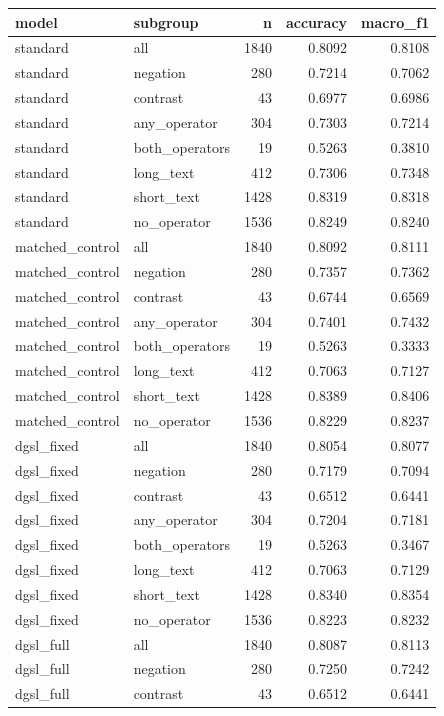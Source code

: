 \begin{tabular}{llrrr}
\toprule
model & subgroup & n & accuracy & macro\_f1 \\
\midrule
standard & all & 1840 & 0.8092 & 0.8108 \\
standard & negation & 280 & 0.7214 & 0.7062 \\
standard & contrast & 43 & 0.6977 & 0.6986 \\
standard & any\_operator & 304 & 0.7303 & 0.7214 \\
standard & both\_operators & 19 & 0.5263 & 0.3810 \\
standard & long\_text & 412 & 0.7306 & 0.7348 \\
standard & short\_text & 1428 & 0.8319 & 0.8318 \\
standard & no\_operator & 1536 & 0.8249 & 0.8240 \\
matched\_control & all & 1840 & 0.8092 & 0.8111 \\
matched\_control & negation & 280 & 0.7357 & 0.7362 \\
matched\_control & contrast & 43 & 0.6744 & 0.6569 \\
matched\_control & any\_operator & 304 & 0.7401 & 0.7432 \\
matched\_control & both\_operators & 19 & 0.5263 & 0.3333 \\
matched\_control & long\_text & 412 & 0.7063 & 0.7127 \\
matched\_control & short\_text & 1428 & 0.8389 & 0.8406 \\
matched\_control & no\_operator & 1536 & 0.8229 & 0.8237 \\
dgsl\_fixed & all & 1840 & 0.8054 & 0.8077 \\
dgsl\_fixed & negation & 280 & 0.7179 & 0.7094 \\
dgsl\_fixed & contrast & 43 & 0.6512 & 0.6441 \\
dgsl\_fixed & any\_operator & 304 & 0.7204 & 0.7181 \\
dgsl\_fixed & both\_operators & 19 & 0.5263 & 0.3467 \\
dgsl\_fixed & long\_text & 412 & 0.7063 & 0.7129 \\
dgsl\_fixed & short\_text & 1428 & 0.8340 & 0.8354 \\
dgsl\_fixed & no\_operator & 1536 & 0.8223 & 0.8232 \\
dgsl\_full & all & 1840 & 0.8087 & 0.8113 \\
dgsl\_full & negation & 280 & 0.7250 & 0.7242 \\
dgsl\_full & contrast & 43 & 0.6512 & 0.6441 \\

\end{tabular}
